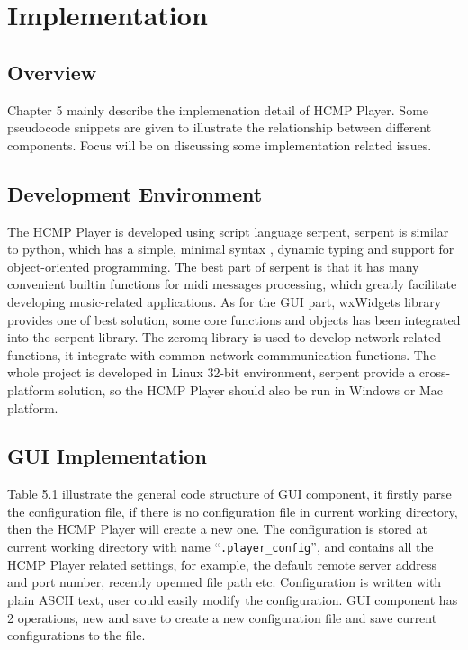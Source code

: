 
\chapter{Implementation} %



\ifpdf
    \graphicspath{{X/figures/PNG/}{X/figures/PDF/}{X/figures/}}
\else
    \graphicspath{{X/figures/EPS/}{X/figures/}}
\fi

\section{Overview}
Chapter 5 mainly describe the implemenation detail of HCMP Player. Some 
pseudocode snippets are given to illustrate the relationship between 
different components. 
Focus will be on discussing some implementation related issues. 

\section{Development Environment}

The HCMP Player is developed using script language 
serpent\cite{Serpent}, serpent is similar to python, which has a simple, 
minimal syntax , dynamic typing and support for object-oriented programming. 
The best part of serpent is 
that it has many convenient builtin functions for midi messages processing, 
which greatly facilitate developing music-related applications. 
As for the GUI part, wxWidgets \cite{wxWidget} library provides one of best 
solution, 
some core functions and objects has been integrated into the serpent library. 
The zeromq library is used to develop network related functions, it integrate 
with common network commmunication functions. The whole project is developed 
in Linux 32-bit environment, serpent provide a cross-platform solution, 
so the HCMP Player should also be run in Windows or Mac platform.

\section{GUI Implementation}
Table 5.1 illustrate the general code structure of GUI component, 
it firstly parse the configuration file, if there is no configuration file 
in current working directory, then the HCMP Player will create a new one.
The configuration is stored 
at current working directory with name ``\texttt{.player\_config}'', and 
contains all the HCMP Player  
related settings, for example, the default remote server address and 
port number, recently openned file path etc. Configuration is written with plain 
ASCII text, user could easily modify the configuration. GUI component has 2 
operations, new and save to create a new configuration file and save current 
configurations to the file.

